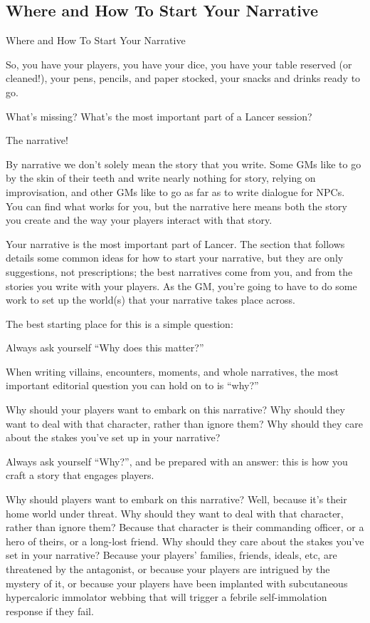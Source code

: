\subsection{Where and How To Start Your Narrative}

                          Where and How To Start Your Narrative

So, you have your players, you have your dice, you have your table reserved (or cleaned!), your
pens, pencils, and paper stocked, your snacks and drinks ready to go.


What’s missing? What’s the most important part of a Lancer session?


The narrative!





By narrative we don’t solely mean the story that you write. Some GMs like to go by the skin of
their teeth and write nearly nothing for story, relying on improvisation, and other GMs like to go
as far as to write dialogue for NPCs. You can find what works for you, but the narrative here
means both the story you create and the way your players interact with that story.


Your narrative is the most important part of Lancer. The section that follows details some
common ideas for how to start your narrative, but they are only suggestions, not prescriptions;
the best narratives come from you, and from the stories you write with your players. As the GM,
you’re going to have to do some work to set up the world(s) that your narrative takes place
across.


The best starting place for this is a simple question:


Always ask yourself  ``Why does this matter?''

When writing villains, encounters, moments, and whole narratives, the most important editorial
question you can hold on to is ``why?''


Why should your players want to embark on this narrative? Why should they want to deal with
that character, rather than ignore them? Why should they care about the stakes you’ve set up in
your narrative?


Always ask yourself ``Why?'', and be prepared with an answer: this is how you craft a story that
engages players.


Why should players want to embark on this narrative? Well, because it’s their home world under
threat. Why should they want to deal with that character, rather than ignore them? Because that
character is their commanding officer, or a hero of theirs, or a long-lost friend. Why should they
care about the stakes you’ve set in your narrative? Because your players’ families, friends,
ideals, etc, are threatened by the antagonist, or because your players are intrigued by the
mystery of it, or because your players have been implanted with subcutaneous hypercaloric
immolator webbing that will trigger a febrile self-immolation response if they fail.


